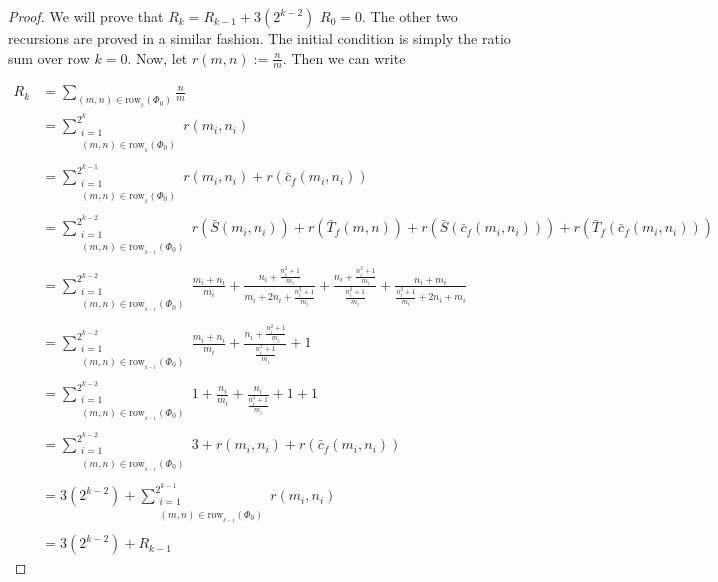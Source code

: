 \documentclass{article}
\begin{document}
\begin{proof}

We will prove that $R_k = R_{k-1} + 3(2^{k-2})$ $R_0 = 0$. The other two recursions are proved in a similar fashion. The initial condition is simply the ratio sum over row $k=0$. Now, let $r(m, n) := \frac{n}{m}$. Then we can write

\begin{align*}
    R_k   &= \sum_{(m, n) \in \text{row}_{_k}(\Phi_0)} \frac{n}{m} \\
    &= \sum_{\substack{
    i = 1 \\ {(m, n) \in \text{row}_{_k}(\Phi_0)} \\}}^{2^k} r(m_i, n_i) \\
    &= \sum_{\substack{
    i = 1 \\ {(m, n) \in \text{row}_{_k}(\Phi_0)} \\}}^{2^{k-1}} r(m_i, n_i) + r\left(\bar{c}_f(m_i, n_i)\right) \\
    &= \sum_{\substack{
    i = 1 \\ {(m, n) \in \text{row}_{_{k-1}}(\Phi_0)} \\}}^{2^{k-2}} r \left(\bar{S}(m_i, n_i)\right) + r\left(\bar{T}_f(m, n)\right) + r \left(\bar{S}(\bar{c}_f(m_i, n_i))\right) + r\left(\bar{T}_f(\bar{c}_f(m_i, n_i))\right) \\
    &= \sum_{\substack{
    i = 1 \\ {(m, n) \in \text{row}_{_{k-1}}(\Phi_0)} \\}}^{2^{k-2}} \frac{m_i + n_i}{m_i} + \frac{n_i + \frac{n_i^2 + 1}{m_i}}{m_i + 2n_i + \frac{n_i^2 + 1}{m_i}} + \frac{n_i + \frac{n_i^2 + 1}{m_i}}{\frac{n_i^2 + 1}{m_i}} + \frac{n_i+m_i}{\frac{n_i^2 + 1}{m_i} + 2n_i + m_i} \\
    &= \sum_{\substack{
    i = 1 \\ {(m, n) \in \text{row}_{_{k-1}}(\Phi_0)} \\}}^{2^{k-2}} \frac{m_i + n_i}{m_i}  + \frac{n_i + \frac{n_i^2 + 1}{m_i}}{\frac{n_i^2 + 1}{m_i}} + 1 \\
    &= \sum_{\substack{
    i = 1 \\ {(m, n) \in \text{row}_{_{k-1}}(\Phi_0)} \\}}^{2^{k-2}} 1 + \frac{n_i}{m_i}  + \frac{n_i}{\frac{n_i^2 + 1}{m_i}} + 1 + 1 \\
    &= \sum_{\substack{
    i = 1 \\ {(m, n) \in \text{row}_{_{k-1}}(\Phi_0)} \\}}^{2^{k-2}} 3 + r(m_i,n_i) + r(\bar{c}_f(m_i, n_i)) \\
    &= 3(2^{k-2}) + \sum_{\substack{
    i = 1 \\ {(m, n) \in \text{row}_{_{k-1}}(\Phi_0)} \\}}^{2^{k-1}} r(m_i,n_i) \\
    &= 3(2^{k-2}) + R_{k-1}\
\end{align*}
\end{proof}
\end{document}
